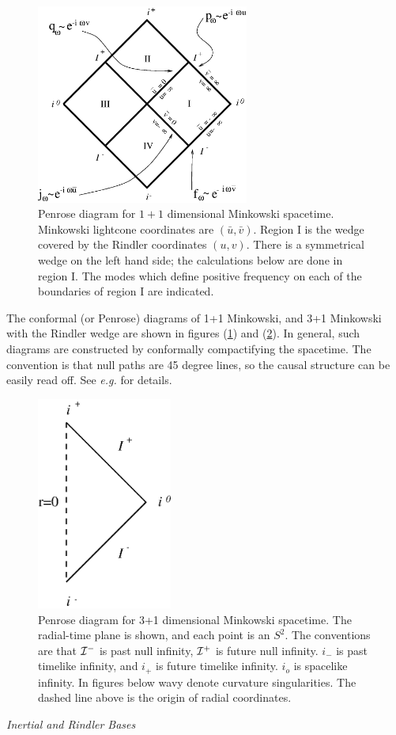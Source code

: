 \documentclass[12pt]{article}
\def\finf{{\cal I}^+}
\def\pinf{{\cal I}^-}
\begin{document}
\begin{figure}[tb]
\begin{center}
\includegraphics[width=2.75in]{minkowski.eps}
\end{center}
\caption{Penrose diagram for $1+1$ dimensional Minkowski spacetime.
Minkowski lightcone coordinates are $(\bar u,\bar v)$.
Region I is the wedge covered by the
Rindler coordinates $(u,v)$. There is a symmetrical wedge on the left hand
side; the
calculations below are done in region I. The modes which define positive
frequency on each of
the boundaries of region I are indicated.}
\label{f1}
\end{figure}

The conformal (or Penrose) diagrams of  1+1 Minkowski, and 3+1 Minkowski with
the Rindler wedge are shown in figures (\ref{f1}) and (\ref{f2}). In general, such
diagrams are constructed
by conformally  compactifying the spacetime. The convention is that null paths
are 45 degree lines, so the causal structure can be easily read off.
See {\it e.g.} \cite{wald, he} for details.
%
\begin{figure}[tb]
\begin{center}
\includegraphics[width=1.75in]{flat.eps}
\end{center}
\caption{Penrose diagram for 3+1 dimensional Minkowski spacetime. The
radial-time plane is
shown, and each point is an $S^2$.
The conventions are that $\pinf$ is past null infinity, $\finf$ is future null
infinity. $i_-$ is past timelike infinity, and  $i_+$  is future timelike
infinity. $i_o$ is spacelike infinity. In figures below wavy denote curvature
singularities. The dashed line above is the  origin of radial coordinates.}
\label{f2}
\end{figure}
%
\vskip 0.1in\noindent
{\it Inertial and Rindler Bases}
\vskip 0.05in
\end{document}
